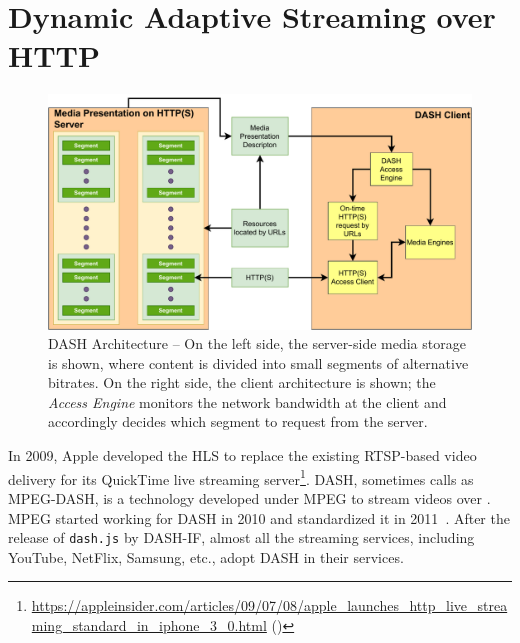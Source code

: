 \section{Dynamic Adaptive Streaming over HTTP}
\begin{figure}[!t]
	\centering
	\includegraphics[width=\linewidth]{img/DASH-arch}
	\caption{\small{DASH Architecture -- On the left side, the server-side media storage is shown, where content is divided into small segments of alternative bitrates. On the right side, the  client architecture is shown; the {\it {} Access Engine} monitors the network bandwidth at the client and accordingly decides which segment to request from the server.}}
	\label{fig:dash}
\end{figure}
In 2009, Apple developed the \ac{HLS} to replace the existing \ac{RTSP}-based video delivery for its QuickTime live streaming server\footnote{\url{https://appleinsider.com/articles/09/07/08/apple_launches_http_live_streaming_standard_in_iphone_3_0.html} (\lastaccessedtoday)}. \Ac{DASH}, sometimes calls as MPEG-DASH, is a technology developed under MPEG to stream videos over . MPEG started working for DASH in 2010 and standardized it in 2011~\cite{ISO/IEC23009-1:2019}. After the release of {\tt dash.js} by \ac{DASH-IF}, almost all the streaming services, including YouTube, NetFlix, Samsung, etc., adopt \ac{DASH} in their services.

